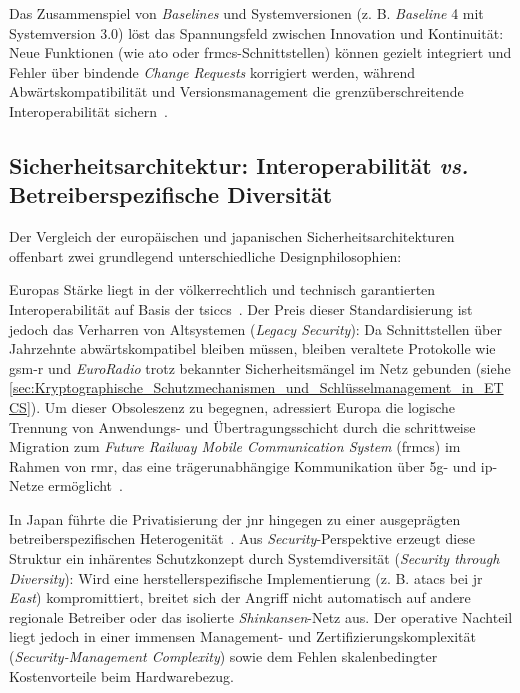 \documentclass[runningheads]{res/llncs}
\begin{document}
Das Zusammenspiel von \textit{Baselines} und Systemversionen (z. B. \textit{Baseline} 4 mit Systemversion 3.0) löst das Spannungsfeld zwischen Innovation und Kontinuität: Neue Funktionen (wie \gls{ato} oder \gls{frmcs}-Schnittstellen) können gezielt integriert und Fehler über bindende \textit{Change Requests} korrigiert werden, während Abwärtskompatibilität und Versionsmanagement die grenzüberschreitende Interoperabilität sichern~\parencite[S. 53, 218--220]{trinckaufETCS2024}.

\subsection{Sicherheitsarchitektur: Interoperabilität \textit{vs.} Betreiberspezifische Diversität}
\label{sec:Sicherheitsarchitektur_Interoperabilität_vs_Betreiberspezifische_Diversität}
Der Vergleich der europäischen und japanischen Sicherheitsarchitekturen offenbart zwei grundlegend unterschiedliche Designphilosophien:

Europas Stärke liegt in der völkerrechtlich und technisch garantierten Interoperabilität auf Basis der \gls{tsiccs}~\parencite[S. 49]{trinckaufETCS2024}. Der Preis dieser Standardisierung ist jedoch das Verharren von Altsystemen (\textit{Legacy Security}): Da Schnittstellen über Jahrzehnte abwärtskompatibel bleiben müssen, bleiben veraltete Protokolle wie \gls{gsm-r} und \textit{EuroRadio} trotz bekannter Sicherheitsmängel im Netz gebunden (siehe \autoref{sec:Kryptographische_Schutzmechanismen_und_Schlüsselmanagement_in_ETCS}). Um dieser Obsoleszenz zu begegnen, adressiert Europa die logische Trennung von Anwendungs- und Übertragungsschicht durch die schrittweise Migration zum \textit{Future Railway Mobile Communication System} (\gls{frmcs}) im Rahmen von \gls{rmr}, das eine trägerunabhängige Kommunikation über \gls{5g}- und \gls{ip}-Netze ermöglicht~\parencite[S. 123, 211]{trinckaufETCS2024}.

In Japan führte die Privatisierung der \gls{jnr} hingegen zu einer ausgeprägten betreiberspezifischen Heterogenität~\parencite[S. 47--49]{yanaseJapanese2011}. Aus \textit{Security}-Perspektive erzeugt diese Struktur ein inhärentes Schutzkonzept durch Systemdiversität (\textit{Security through Diversity}): Wird eine herstellerspezifische Implementierung (z. B. \gls{atacs} bei \gls{jr} \textit{East}) kompromittiert, breitet sich der Angriff nicht automatisch auf andere regionale Betreiber oder das isolierte \textit{Shinkansen}-Netz aus. Der operative Nachteil liegt jedoch in einer immensen Management- und Zertifizierungskomplexität (\textit{Security-Management Complexity}) sowie dem Fehlen skalenbedingter Kostenvorteile beim Hardwarebezug.
\end{document}
